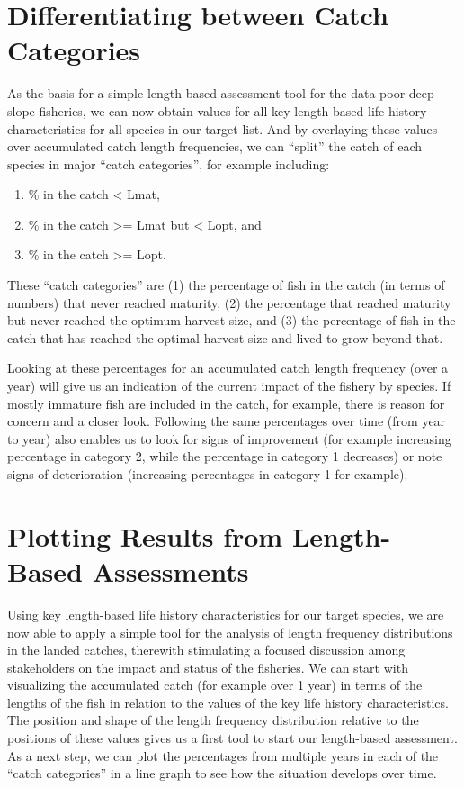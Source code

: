 \section{Differentiating between Catch Categories}

As the basis for a simple length-based assessment tool for the data poor deep slope fisheries, we can now obtain values for all key length-based life history characteristics for all species in our target list. And by overlaying these values over accumulated catch length frequencies, we can ``split'' the catch of each species in major ``catch categories'', for example including:

\begin{enumerate}[noitemsep,topsep=0pt,parsep=0pt,partopsep=0pt]
\item \% in the catch < Lmat,
\item \% in the catch >= Lmat but < Lopt, and
\item \% in the catch >= Lopt.
\end{enumerate}

These ``catch categories'' are (1) the percentage of fish in the catch (in terms of numbers) that never reached maturity, (2) the percentage that reached maturity but never reached the optimum harvest size, and (3) the percentage of fish in the catch that has reached the optimal harvest size and lived to grow beyond that.

Looking at these percentages for an accumulated catch length frequency (over a year) will give us an indication of the current impact of the fishery by species. If mostly immature fish are included in the catch, for example, there is reason for concern and a closer look. Following the same percentages over time (from year to year) also enables us to look for signs of improvement (for example increasing percentage in category 2, while the percentage in category 1 decreases) or note signs of deterioration (increasing percentages in category 1 for example).

\section{Plotting Results from Length-Based Assessments}
Using key length-based life history characteristics for our target species, we are now able to apply a simple tool for the analysis of length frequency distributions in the landed catches, therewith stimulating a focused discussion among stakeholders on the impact and status of the fisheries. We can start with visualizing the accumulated catch (for example over 1 year) in terms of the lengths of the fish in relation to the values of the key life history characteristics. The position and shape of the length frequency distribution relative to the positions of these values gives us a first tool to start our length-based assessment. As a next step, we can plot the percentages from multiple years in each of the ``catch categories'' in a line graph to see how the situation develops over time. 

